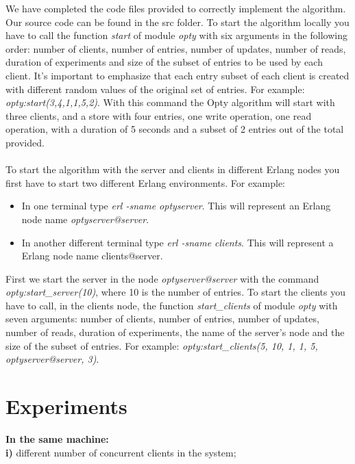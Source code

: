 \documentclass[a4paper, 11pt]{article}
\begin{document}
We have completed the code files provided to correctly implement the algorithm. Our source code can be found in the src folder. To start the algorithm locally you have to call the function \textit{start} of module \textit{opty} with six arguments in the following order: number of clients, number of entries, number of updates, number of reads, duration of experiments and size of the subset of entries to be used by each client. It's important to emphasize that each entry subset of each client is created with different random values of the original set of entries. For example: \textit{opty:start(3,4,1,1,5,2)}. With this command the Opty algorithm will start with three clients, and a store with four entries, one write operation, one read operation, with a duration of 5 seconds and a subset of 2 entries out of the total provided.\\\\
To start the algorithm with the server and clients in different Erlang nodes you first have to start two different Erlang environments. For example:
\begin{itemize}
\item In one terminal type \textit{erl -sname optyserver}. This will represent an Erlang node name \textit{optyserver@server}.\\
\item In another different terminal type \textit{erl -sname clients}. This will represent a Erlang node name {clients@server}.\\
\end{itemize}
%
First we start the server in the node \textit{optyserver@server} with the command \textit{opty:start\_server(10)}, where 10 is the number of entries. To start the clients you have to call, in the clients node, the function \textit{start\_clients} of module \textit{opty} with seven arguments: number of clients, number of entries, number of updates, number of reads, duration of experiments, the name of the server’s node and the size of the subset of entries. For example: 
\textit{opty:start\_clients(5, 10, 1, 1, 5, optyserver@server, 3)}.\\

\section{Experiments}

\textbf{In the same machine:}\\

\textbf{i)} different number of concurrent clients in the system;\\
\end{document}
